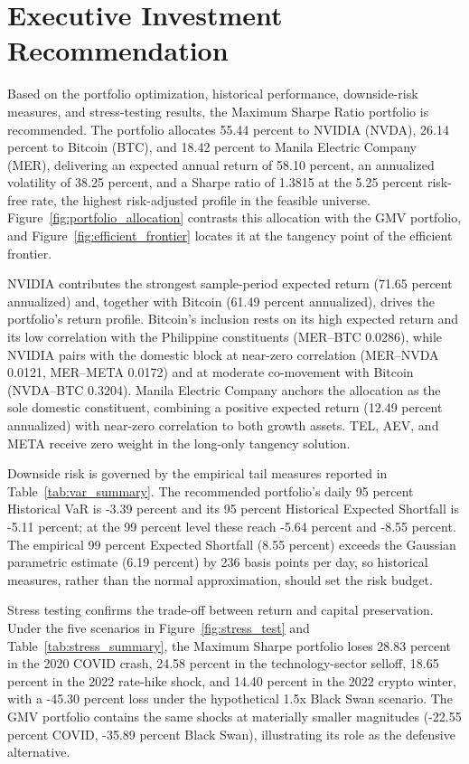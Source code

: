 \section{Executive Investment Recommendation}

Based on the portfolio optimization, historical performance, downside-risk measures, and stress-testing results, the Maximum Sharpe Ratio portfolio is recommended. The portfolio allocates 55.44 percent to NVIDIA (NVDA), 26.14 percent to Bitcoin (BTC), and 18.42 percent to Manila Electric Company (MER), delivering an expected annual return of 58.10 percent, an annualized volatility of 38.25 percent, and a Sharpe ratio of 1.3815 at the 5.25 percent risk-free rate, the highest risk-adjusted profile in the feasible universe. Figure~\ref{fig:portfolio_allocation} contrasts this allocation with the GMV portfolio, and Figure~\ref{fig:efficient_frontier} locates it at the tangency point of the efficient frontier.

NVIDIA contributes the strongest sample-period expected return (71.65 percent annualized) and, together with Bitcoin (61.49 percent annualized), drives the portfolio's return profile. Bitcoin's inclusion rests on its high expected return and its low correlation with the Philippine constituents (MER--BTC 0.0286), while NVIDIA pairs with the domestic block at near-zero correlation (MER--NVDA 0.0121, MER--META 0.0172) and at moderate co-movement with Bitcoin (NVDA--BTC 0.3204). Manila Electric Company anchors the allocation as the sole domestic constituent, combining a positive expected return (12.49 percent annualized) with near-zero correlation to both growth assets. TEL, AEV, and META receive zero weight in the long-only tangency solution.

Downside risk is governed by the empirical tail measures reported in Table~\ref{tab:var_summary}. The recommended portfolio's daily 95 percent Historical VaR is -3.39 percent and its 95 percent Historical Expected Shortfall is -5.11 percent; at the 99 percent level these reach -5.64 percent and -8.55 percent. The empirical 99 percent Expected Shortfall (8.55 percent) exceeds the Gaussian parametric estimate (6.19 percent) by 236 basis points per day, so historical measures, rather than the normal approximation, should set the risk budget.

Stress testing confirms the trade-off between return and capital preservation. Under the five scenarios in Figure~\ref{fig:stress_test} and Table~\ref{tab:stress_summary}, the Maximum Sharpe portfolio loses 28.83 percent in the 2020 COVID crash, 24.58 percent in the technology-sector selloff, 18.65 percent in the 2022 rate-hike shock, and 14.40 percent in the 2022 crypto winter, with a -45.30 percent loss under the hypothetical 1.5x Black Swan scenario. The GMV portfolio contains the same shocks at materially smaller magnitudes (-22.55 percent COVID, -35.89 percent Black Swan), illustrating its role as the defensive alternative.

